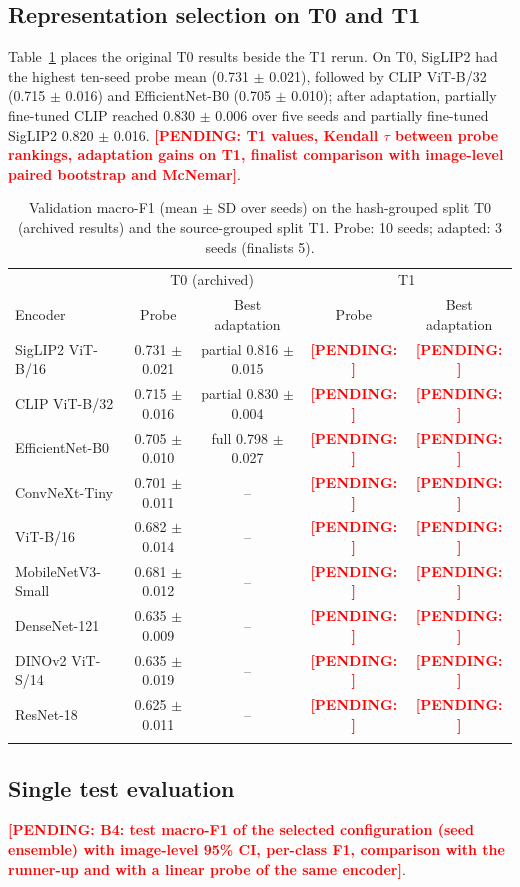 \documentclass[pdflatex,sn-mathphys-num]{sn-jnl}
\newcommand{\pending}[1]{\textcolor{red}{\textbf{[PENDING: #1]}}}
\begin{document}
\subsection{Representation selection on T0 and T1}\label{sec:res-rep}
Table~\ref{tab:rep} places the original T0 results beside the T1 rerun. On T0, SigLIP2 had the highest ten-seed probe mean (0.731 $\pm$ 0.021), followed by CLIP ViT-B/32 (0.715 $\pm$ 0.016) and EfficientNet-B0 (0.705 $\pm$ 0.010); after adaptation, partially fine-tuned CLIP reached 0.830 $\pm$ 0.006 over five seeds and partially fine-tuned SigLIP2 0.820 $\pm$ 0.016. \pending{T1 values, Kendall $\tau$ between probe rankings, adaptation gains on T1, finalist comparison with image-level paired bootstrap and McNemar}.

\begin{table}[t]
\caption{Validation macro-F1 (mean $\pm$ SD over seeds) on the hash-grouped split T0 (archived results) and the source-grouped split T1. Probe: 10 seeds; adapted: 3 seeds (finalists 5).}\label{tab:rep}
\begin{tabular}{@{}lcccc@{}}
\toprule
 & \multicolumn{2}{c}{T0 (archived)} & \multicolumn{2}{c}{T1} \\
Encoder & Probe & Best adaptation & Probe & Best adaptation \\
\midrule
SigLIP2 ViT-B/16 & 0.731 $\pm$ 0.021 & partial 0.816 $\pm$ 0.015 & \pending{} & \pending{} \\
CLIP ViT-B/32 & 0.715 $\pm$ 0.016 & partial 0.830 $\pm$ 0.004 & \pending{} & \pending{} \\
EfficientNet-B0 & 0.705 $\pm$ 0.010 & full 0.798 $\pm$ 0.027 & \pending{} & \pending{} \\
ConvNeXt-Tiny & 0.701 $\pm$ 0.011 & -- & \pending{} & \pending{} \\
ViT-B/16 & 0.682 $\pm$ 0.014 & -- & \pending{} & \pending{} \\
MobileNetV3-Small & 0.681 $\pm$ 0.012 & -- & \pending{} & \pending{} \\
DenseNet-121 & 0.635 $\pm$ 0.009 & -- & \pending{} & \pending{} \\
DINOv2 ViT-S/14 & 0.635 $\pm$ 0.019 & -- & \pending{} & \pending{} \\
ResNet-18 & 0.625 $\pm$ 0.011 & -- & \pending{} & \pending{} \\
\botrule
\end{tabular}
\end{table}

\subsection{Single test evaluation}\label{sec:res-test}
\pending{B4: test macro-F1 of the selected configuration (seed ensemble) with image-level 95\% CI, per-class F1, comparison with the runner-up and with a linear probe of the same encoder}.
\end{document}
